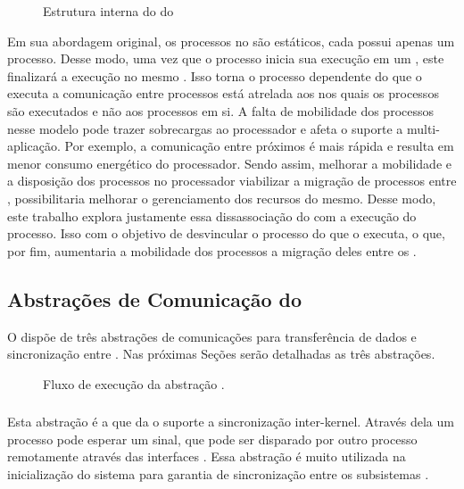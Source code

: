 \begin{figure}[bt]
    \centering
    
    \caption{Estrutura interna do \microkernel do \nanvix \cite{penna:thesis}}\label{fig.microkernel-overview}
\end{figure}

Em sua abordagem original, os processos no \nanvix são estáticos, \ie cada \cluster possui apenas um processo. Desse modo, uma vez que o processo inicia sua execução em um \cluster, este finalizará a execução no mesmo \cluster. 
Isso torna o processo dependente do \cluster que o executa \eg a comunicação entre processos está atrelada aos \clusters nos quais os processos são executados e não aos processos em si. A falta de mobilidade dos processos nesse modelo pode trazer sobrecargas ao processador e afeta o suporte a multi-aplicação. Por exemplo, a comunicação entre \clusters próximos é mais rápida e resulta em menor consumo energético do processador. Sendo assim, melhorar a mobilidade e a disposição dos processos no processador \ie viabilizar a migração de processos entre \clusters, possibilitaria melhorar o gerenciamento dos recursos do mesmo. Desse modo, este trabalho explora justamente essa dissassociação do \hardware com a execução do processo. Isso com o objetivo de desvincular o processo do \cluster que o executa, o que, por fim, aumentaria a mobilidade dos processos \ie a migração deles entre os \clusters.

\subsection{Abstrações de Comunicação do \nanvix}
O \nanvix dispõe de três abstrações de comunicações para transferência de dados e sincronização entre \clusters \cite{penna:thesis}. Nas próximas Seções serão detalhadas as três abstrações.

\begin{figure}[tb]
    \centering%
    \quad%
    \caption{Fluxo de execução da abstração \sync \cite{penna:thesis}.\label{fig.sync}}%
\end{figure}

\subsubsection{\sync}
Esta abstração é a que da o suporte a sincronização inter-kernel. Através dela um processo pode esperar um sinal, que pode ser disparado por outro processo remotamente através das interfaces \noc. Essa abstração é muito utilizada na inicialização do sistema para garantia de sincronização entre os subsistemas \cite{penna:thesis}.

